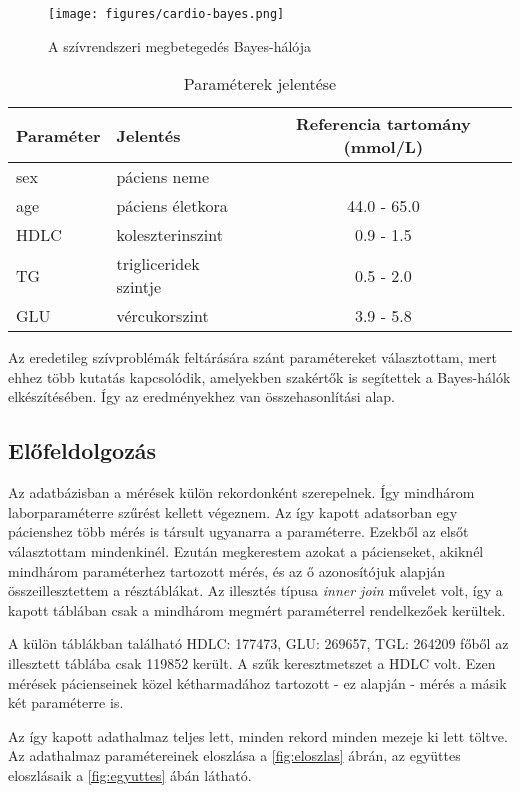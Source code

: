 \begin{figure}
    \centering
    \texttt{[image: figures/cardio-bayes.png]}
    \caption{A szívrendszeri megbetegedés Bayes-hálója}
    \label{fig:cardio-bayes}
\end{figure}

\begin{table}[]
\begin{tabular}{llc}
Paraméter & Jelentés & Referencia tartomány (mmol/L) \\
\hline
sex  & páciens neme &         \\
age  & páciens életkora & 44.0 - 65.0\footnotemark\\
HDLC & koleszterinszint & 0.9 - 1.5     \\
TG   & trigliceridek szintje & 0.5 - 2.0 \\
GLU  & vércukorszint    & 3.9 - 5.8    
\end{tabular}
\caption{Paraméterek jelentése}
\label{tab:parameterek_jelentese}
\end{table}

Az eredetileg szívproblémák feltárására szánt paramétereket választottam, mert ehhez több kutatás kapcsolódik, amelyekben szakértők is segítettek a Bayes-hálók elkészítésében. Így az eredményekhez van összehasonlítási alap.

\subsection{Előfeldolgozás}
Az adatbázisban a mérések külön rekordonként szerepelnek. Így mindhárom laborparaméterre szűrést kellett végeznem. Az így kapott adatsorban egy pácienshez több mérés is társult ugyanarra a paraméterre. Ezekből az elsőt választottam mindenkinél. Ezután megkerestem azokat a pácienseket, akiknél mindhárom paraméterhez tartozott mérés, és az ő azonosítójuk alapján összeillesztettem a résztáblákat. Az illesztés típusa \emph{inner join} művelet volt, így a kapott táblában csak a mindhárom megmért paraméterrel rendelkezőek kerültek. 

A külön táblákban található HDLC: 177473, GLU: 269657, TGL: 264209 főből az illesztett táblába csak 119852 került. A szűk keresztmetszet a HDLC volt. Ezen mérések pácienseinek közel kétharmadához tartozott - ez alapján - mérés a másik két paraméterre is.

Az így kapott adathalmaz teljes lett, minden rekord minden mezeje ki lett töltve. Az adathalmaz paramétereinek eloszlása a \ref{fig:eloszlas} ábrán, az együttes eloszlásaik a \ref{fig:egyuttes} ábán látható.

